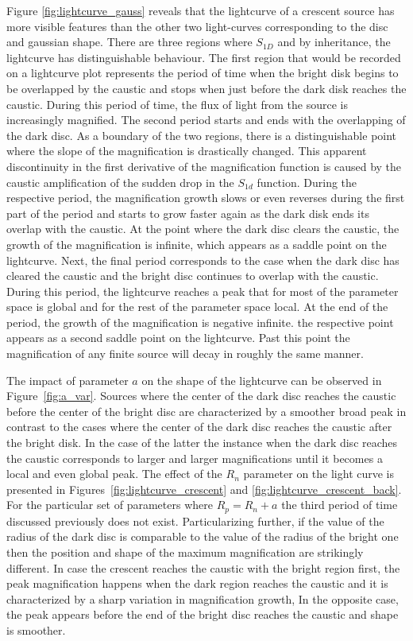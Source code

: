 \documentclass[usenatbib]{mn2e}
\begin{document}
Figure \ref{fig:lightcurve_gauss} reveals that the 
lightcurve of a crescent source has more
visible features than the other two light-curves corresponding to the
disc and gaussian shape. There are three regions where $S_{1D}$ and by
inheritance, the lightcurve has distinguishable behaviour. The first
region that would be recorded on a lightcurve plot represents the
period of time when the bright disk begins to be overlapped by the
caustic and stops when just before the dark disk reaches the
caustic. During this period of time, the flux of light from the source
is increasingly magnified. The second period starts and ends with the
overlapping of the dark disc. As a boundary of the two regions, there
is a distinguishable point where the slope of the magnification is
drastically changed. This apparent discontinuity in the first
derivative of the magnification function is caused by the caustic
amplification of the sudden drop in the $S_{1d}$ function. During the
respective period, the magnification growth slows or even reverses
during the first part of the period and starts to grow faster again as
the dark disk ends its overlap with the caustic. At the point where
the dark disc clears the caustic, the growth of the magnification is
infinite, which appears as a saddle point on the lightcurve. Next, the
final period corresponds to the case when the dark disc has cleared
the caustic and the bright disc continues to overlap with the
caustic. During this period, the lightcurve reaches a peak that for
most of the parameter space is global and for the rest of the
parameter space local.  At the end of the period, the growth of the
magnification is negative infinite. the respective point appears as a
second saddle point on the lightcurve. Past this point the
magnification of any finite source will decay in roughly the same
manner.

The impact of parameter $a$ on the shape of the lightcurve can be
observed in Figure~\ref{fig:a_var}. Sources where the center of the
dark disc reaches the caustic before the center of the bright disc are
characterized by a smoother broad peak in contrast to the cases where
the center of the dark disc reaches the caustic after the bright disk.
In the case of the latter the instance when the dark disc reaches the
caustic corresponds to larger and larger magnifications until it
becomes a local and even global peak. The effect of the $R_n$
parameter on the light curve is presented in
Figures~\ref{fig:lightcurve_crescent} and
\ref{fig:lightcurve_crescent_back}. For the particular set of
parameters where $R_p = R_n +a$ the third period of time discussed
previously does not exist. Particularizing further, if the value of
the radius of the dark disc is comparable to the value of the radius
of the bright one then the position and shape of the maximum
magnification are strikingly different. In case the crescent reaches
the caustic with the bright region first, the peak magnification
happens when the dark region reaches the caustic and it is
characterized by a sharp variation in magnification growth, In the
opposite case, the peak appears before the end of the bright disc
reaches the caustic and shape is smoother.
\end{document}
